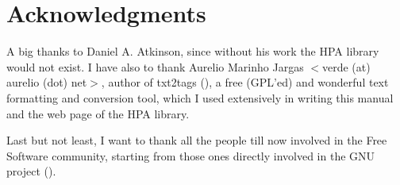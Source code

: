 \documentclass{article}
\begin{document}
\hypertarget{toc20}{}
\section{Acknowledgments}
A big thanks to Daniel A. Atkinson,
since without his work the HPA library would not exist.
I have also to thank Aurelio Marinho Jargas 
$<$verde (at) aurelio (dot) net$>$, author of txt2tags 
(), a free (GPL'ed) and wonderful
text formatting and conversion tool, 
which I used extensively in writing this manual
and the web page of the HPA library.

Last but not least, I want to thank all the
people till now involved in the Free Software
community, starting from those ones directly involved
in the GNU project ().


\hypertarget{GNUFDL}{}
\end{document}
